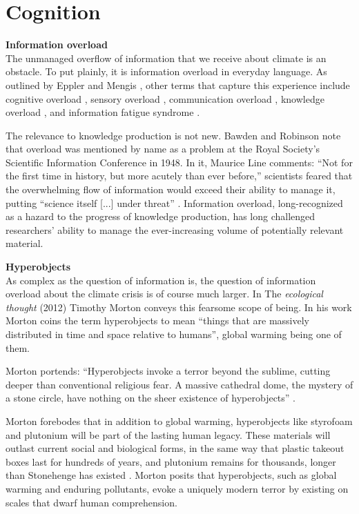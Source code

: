 \section{Cognition}
\textbf{Information overload} \\
The unmanaged overflow of information that we receive about climate is an obstacle. To put plainly, it is information overload in everyday language. As outlined by Eppler and Mengis \citep[p. 326]{eppler_concept_2004}, other terms that capture this experience include cognitive overload \citep{vollmann_cutting_1991}, sensory overload \citep{lipowski_sensory_1975}, communication overload \citep{meier_communications_1963}, knowledge overload \citep{hunt_medical_1997}, and information fatigue syndrome \citep{wurman_information_2001}. 

The relevance to knowledge production is not new. Bawden and Robinson note that overload was mentioned by name as a problem at the Royal Society’s Scientific Information Conference in 1948. In it, Maurice Line comments: ``Not for the first time in history, but more acutely than ever before,” scientists feared that the overwhelming flow of information would exceed their ability to manage it, putting “science itself [...] under threat” \citep[p. 183]{bawden_dark_2009}. Information overload, long-recognized as a hazard to the progress of knowledge production, has long challenged researchers' ability to manage the ever-increasing volume of potentially relevant material.

\noindent \textbf{Hyperobjects} \\
As complex as the question of information is, the question of information overload about the climate crisis is of course much larger. In The \textit{ecological thought} (2012) Timothy Morton conveys this fearsome scope of being. In his work Morton coins the term hyperobjects to mean “things that are massively distributed in time and space relative to humans”, global warming being one of them. 

Morton portends: ``Hyperobjects invoke a terror beyond the sublime, cutting deeper than conventional religious fear. A massive cathedral dome, the mystery of a stone circle, have nothing on the sheer existence of hyperobjects” \citep[p. 131]{morton_ecological_2012}. 

Morton forebodes that in addition to global warming, hyperobjects like styrofoam and plutonium will be part of the lasting human legacy. These materials will outlast current social and biological forms, in the same way that plastic takeout boxes last for hundreds of years, and plutonium remains for thousands, longer than Stonehenge has existed \citep[p. 130]{morton_ecological_2012}. Morton posits that hyperobjects, such as global warming and enduring pollutants, evoke a uniquely modern terror by existing on scales that dwarf human comprehension.

